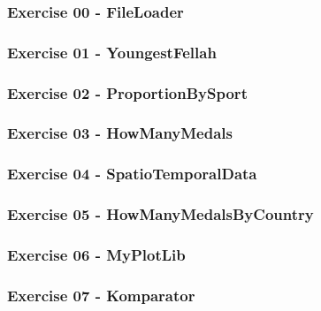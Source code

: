 \documentclass[]{article}
\begin{document}
\hypertarget{exercise-00---fileloader}{%
\subsubsection{Exercise 00 -
FileLoader}\label{exercise-00---fileloader}}

\hypertarget{exercise-01---youngestfellah}{%
\subsubsection{Exercise 01 -
YoungestFellah}\label{exercise-01---youngestfellah}}

\hypertarget{exercise-02---proportionbysport}{%
\subsubsection{Exercise 02 -
ProportionBySport}\label{exercise-02---proportionbysport}}

\hypertarget{exercise-03---howmanymedals}{%
\subsubsection{Exercise 03 -
HowManyMedals}\label{exercise-03---howmanymedals}}

\hypertarget{exercise-04---spatiotemporaldata}{%
\subsubsection{Exercise 04 -
SpatioTemporalData}\label{exercise-04---spatiotemporaldata}}

\hypertarget{exercise-05---howmanymedalsbycountry}{%
\subsubsection{Exercise 05 -
HowManyMedalsByCountry}\label{exercise-05---howmanymedalsbycountry}}

\hypertarget{exercise-06---myplotlib}{%
\subsubsection{Exercise 06 - MyPlotLib}\label{exercise-06---myplotlib}}

\hypertarget{exercise-07---komparator}{%
\subsubsection{Exercise 07 -
Komparator}\label{exercise-07---komparator}}
\end{document}
